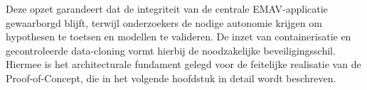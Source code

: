 Deze opzet garandeert dat de integriteit van de centrale EMAV-applicatie gewaarborgd blijft, terwijl onderzoekers de nodige autonomie krijgen om hypothesen te toetsen en modellen te valideren. De inzet van containerisatie en gecontroleerde data-cloning vormt hierbij de noodzakelijke beveiligingsschil. Hiermee is het architecturale fundament gelegd voor de feitelijke realisatie van de Proof-of-Concept, die in het volgende hoofdstuk in detail wordt beschreven.

